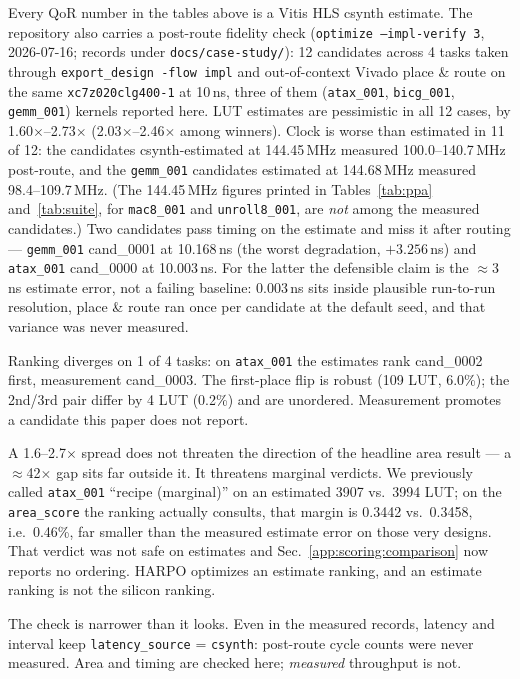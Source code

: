 Every QoR number in the tables above is a Vitis HLS csynth estimate. The repository also
carries a post-route fidelity check (\texttt{optimize --impl-verify 3},
2026-07-16; records under \texttt{docs/case-study/}): 12 candidates across 4 tasks
taken through \texttt{export\_design -flow impl} and out-of-context Vivado place
\& route on the same \texttt{xc7z020clg400-1} at 10\,ns, three of them
(\texttt{atax\_001}, \texttt{bicg\_001}, \texttt{gemm\_001}) kernels reported here.
LUT estimates are pessimistic in all 12 cases, by 1.60$\times$--2.73$\times$
(2.03$\times$--2.46$\times$ among winners). Clock is worse than estimated in 11 of 12:
the candidates csynth-estimated at 144.45\,MHz measured 100.0--140.7\,MHz post-route,
and the \texttt{gemm\_001} candidates estimated at 144.68\,MHz measured
98.4--109.7\,MHz. (The 144.45\,MHz figures printed in Tables~\ref{tab:ppa}
and~\ref{tab:suite}, for \texttt{mac8\_001} and \texttt{unroll8\_001}, are \emph{not}
among the measured candidates.) Two
candidates pass timing on the estimate and miss it after routing ---
\texttt{gemm\_001} cand\_0001 at 10.168\,ns (the worst degradation, $+3.256$\,ns)
and \texttt{atax\_001} cand\_0000 at 10.003\,ns. For the latter the defensible
claim is the $\approx$3\,ns estimate error, not a failing baseline: 0.003\,ns sits
inside plausible run-to-run resolution, place \& route ran once per candidate at
the default seed, and that variance was never measured.

Ranking diverges on 1 of 4 tasks: on \texttt{atax\_001} the estimates rank
cand\_0002 first, measurement cand\_0003. The first-place flip is
robust (109 LUT, 6.0\%); the 2nd/3rd pair differ by 4 LUT (0.2\%) and are
unordered. Measurement promotes a candidate this paper does not report.

A 1.6--2.7$\times$ spread does not threaten the direction of the headline area
result --- a $\approx$42$\times$ gap sits far outside it. It threatens marginal
verdicts. We previously called \texttt{atax\_001} ``recipe (marginal)'' on an
estimated 3907 vs.\ 3994 LUT; on the \texttt{area\_score} the ranking actually
consults, that margin is 0.3442 vs.\ 0.3458, i.e.\ 0.46\%, far smaller than the
measured estimate error on those very designs. That verdict was not safe on
estimates and Sec.~\ref{app:scoring:comparison} now reports no ordering. HARPO optimizes an estimate ranking, and an estimate
ranking is not the silicon ranking.

The check is narrower than it looks. Even in the measured records, latency
and interval keep \texttt{latency\_source} = \texttt{csynth}: post-route cycle
counts were never measured. Area and timing are checked here; \emph{measured}
throughput is not.

